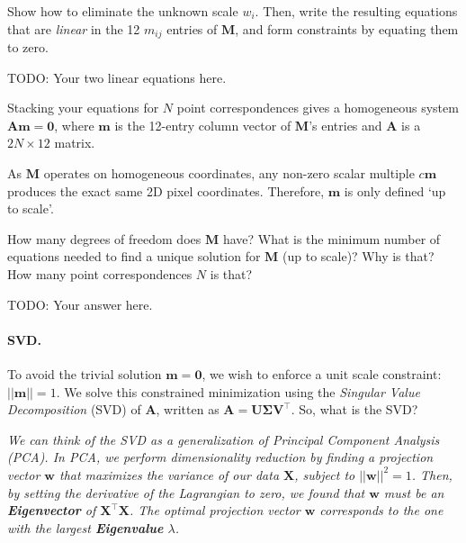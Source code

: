 \documentclass{csci1430}
\begin{document}
\begin{subquestion}[points=2]
Show how to eliminate the unknown scale $w_i$. Then, write the resulting equations that are \emph{linear} in the 12 $m_{ij}$ entries of $\mathbf{M}$, and form constraints by equating them to zero.
\end{subquestion}

\begin{answer}[height=18]
TODO: Your two linear equations here.
\end{answer}

\pagebreak


\begin{subquestion}[points=2,drawbox=false]
Stacking your equations for $N$ point correspondences gives a homogeneous system $\mathbf{A}\mathbf{m} = \mathbf{0}$, where $\mathbf{m}$ is the 12-entry column vector of $\mathbf{M}$'s entries and $\mathbf{A}$ is a $2N \times 12$ matrix.

As $\mathbf{M}$ operates on homogeneous coordinates, any non-zero scalar multiple $c\mathbf{m}$ produces the exact same 2D pixel coordinates. Therefore, $\mathbf{m}$ is only defined `up to scale'.

\begin{orangebox}
How many degrees of freedom does $\mathbf{M}$ have?
What is the minimum number of equations needed to find a unique solution for $\mathbf{M}$ (up to scale)?
Why is that?
How many point correspondences $N$ is that?
\end{orangebox}
\end{subquestion}

\begin{answer}[height=8]
TODO: Your answer here.
\end{answer}

\pagebreak

\paragraph{SVD.}
To avoid the trivial solution $\mathbf{m} = \mathbf{0}$, we wish to enforce a unit scale constraint: $||\mathbf{m}|| = 1$. We solve this constrained minimization using the \emph{Singular Value Decomposition} (SVD) of $\mathbf{A}$, written as $\mathbf{A} = \mathbf{U}\boldsymbol{\Sigma}\mathbf{V}^\top$. So, what is the SVD?

\textit{We can think of the SVD as a generalization of Principal Component Analysis (PCA). In PCA, we perform dimensionality reduction by finding a projection vector $\mathbf{w}$ that maximizes the variance of our data $\mathbf{X}$, subject to $||\mathbf{w}||^2=1$. Then, by setting the derivative of the Lagrangian to zero, we found that $\mathbf{w}$ must be an \textbf{Eigenvector} of $\mathbf{X}^\top\mathbf{X}$. The optimal projection vector $\mathbf{w}$ corresponds to the one with the largest \textbf{Eigenvalue} $\lambda$.}
\end{document}
